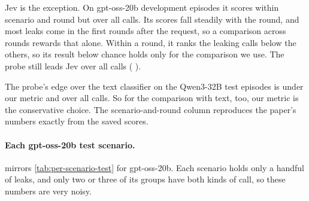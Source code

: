 Jev is the exception.
On gpt-oss-20b development episodes it scores \eEighteenGptDevJevRound{} within scenario and round but \eEighteenGptDevJevPooled{} over all calls.
Its scores fall steadily with the round, and most leaks come in the first rounds after the request, so a comparison across rounds rewards that alone.
Within a round, it ranks the leaking calls below the others, so its result below chance holds only for the comparison we use.
The probe still leads Jev over all calls (\eEighteenGptDevProbeMinusJevPooled{} \eEighteenGptDevProbeMinusJevPooledCI{}).

The probe's edge over the text classifier on the Qwen3-32B test episodes is \eEighteenQwenTestProbeMinusTextRound{} \eEighteenQwenTestProbeMinusTextRoundCI{} under our metric and \eEighteenQwenTestProbeMinusTextPooled{} \eEighteenQwenTestProbeMinusTextPooledCI{} over all calls.
So for the comparison with text, too, our metric is the conservative choice.
The scenario-and-round column reproduces the paper's numbers exactly from the saved scores.

\begin{table}[h]
  \centering
  \scriptsize
  \setlength{\tabcolsep}{2.5pt}
  
  \caption{\textbf{Per-call AUROC under three ways of choosing which calls to compare.} Scenario and round is the metric used throughout the paper. Scenario only compares calls across all rounds of a scenario; all calls compares every leaking call with every non-leaking call. One group out gives the lowest and highest AUROC when any single kept scenario-and-round group is removed. All rows use saved scores, with 95\% episode-clustered bootstrap intervals.}
  \label{tab:metric-variants}
\end{table}

\paragraph{Each gpt-oss-20b test scenario.}
 mirrors \cref{tab:per-scenario-test} for gpt-oss-20b.
Each scenario holds only a handful of leaks, and only two or three of its groups have both kinds of call, so these numbers are very noisy.

\begin{table}[h]
  \centering
  \small
  
  \caption{\textbf{The two gpt-oss-20b probes on each test scenario.} AUROC within scenario and round, from the frozen test scores. Groups kept are scenario-and-round groups that hold both leaking and non-leaking calls.}
  \label{tab:gpt-scenarios-test}
\end{table}

